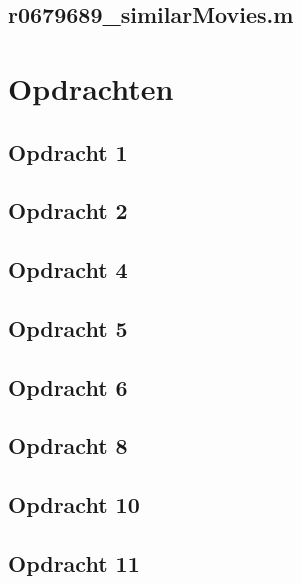 \documentclass[11pt, a4paper, titlepage, openright]{article}
\begin{document}
    \subsection{r0679689\_similarMovies.m}
        

\section{Opdrachten}

	\subsection{Opdracht 1}
		
	\subsection{Opdracht 2}
    \label{appendix:ex2}
		
	\subsection{Opdracht 4}
    \label{appendix:ex4}
		
    \subsection{Opdracht 5}
        
    \subsection{Opdracht 6}
        
    \subsection{Opdracht 8}
        \label{appendix:ex8}
        
	\subsection{Opdracht 10}
        \label{appendix:ex10}
		
	\subsection{Opdracht 11}
		
\end{document}
